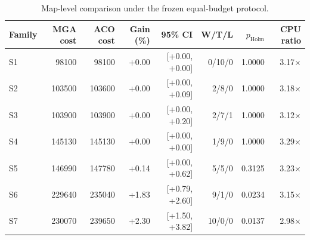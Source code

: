 \begin{table}[t]
\centering
\scriptsize
\caption{Map-level comparison under the frozen equal-budget protocol.}
\label{tab:main-results}
\setlength{\tabcolsep}{2.2pt}
\begin{tabular}{lrrrrrrr}
\toprule
Family & MGA cost & ACO cost & Gain (\%) & 95\% CI & W/T/L & $p_{\mathrm{Holm}}$ & CPU ratio \\
\midrule
S1 & 98100 & 98100 & +0.00 & [+0.00, +0.00] & 0/10/0 & 1.0000 & 3.17$\times$ \\
S2 & 103500 & 103600 & +0.00 & [+0.00, +0.09] & 2/8/0 & 1.0000 & 3.18$\times$ \\
S3 & 103900 & 103900 & +0.00 & [+0.00, +0.20] & 2/7/1 & 1.0000 & 3.12$\times$ \\
S4 & 145130 & 145130 & +0.00 & [+0.00, +0.00] & 1/9/0 & 1.0000 & 3.29$\times$ \\
S5 & 146990 & 147780 & +0.14 & [+0.00, +0.62] & 5/5/0 & 0.3125 & 3.23$\times$ \\
S6 & 229640 & 235040 & +1.83 & [+0.79, +2.60] & 9/1/0 & 0.0234 & 3.15$\times$ \\
S7 & 230070 & 239650 & +2.30 & [+1.50, +3.82] & 10/0/0 & 0.0137 & 2.98$\times$ \\
\bottomrule
\end{tabular}
\end{table}
